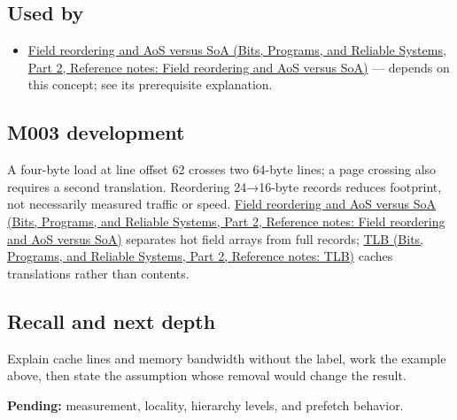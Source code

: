 \subsection{Used by}\label{appendix-e4ccdbab8320-used-by}

\hypertarget{appendix-e4ccdbab8320-used-by}{}

\begin{itemize}
\tightlist
\item
  \href{../01-Bits-Programs-and-Reliable-Systems-P02/main.pdf\#appendix-5522ad176ca0}{Field reordering and AoS versus SoA (Bits, Programs, and Reliable Systems, Part 2, Reference notes: Field reordering and AoS versus SoA)} --- depends on this concept; see its prerequisite explanation.
\end{itemize}

\subsection{M003 development}\label{appendix-e4ccdbab8320-m003-development}

\hypertarget{appendix-e4ccdbab8320-m003-development}{}

A four-byte load at line offset 62 crosses two 64-byte lines; a page crossing also requires a second translation. Reordering 24→16-byte records reduces footprint, not necessarily measured traffic or speed. \href{../01-Bits-Programs-and-Reliable-Systems-P02/main.pdf\#appendix-5522ad176ca0}{Field reordering and AoS versus SoA (Bits, Programs, and Reliable Systems, Part 2, Reference notes: Field reordering and AoS versus SoA)} separates hot field arrays from full records; \href{../01-Bits-Programs-and-Reliable-Systems-P02/main.pdf\#appendix-7a2d9c5ce511}{TLB (Bits, Programs, and Reliable Systems, Part 2, Reference notes: TLB)} caches translations rather than contents.

\subsection{Recall and next depth}\label{appendix-e4ccdbab8320-recall-and-next-depth}

\hypertarget{appendix-e4ccdbab8320-recall-and-next-depth}{}

Explain cache lines and memory bandwidth without the label, work the example above, then state the assumption whose removal would change the result.

\textbf{Pending:} measurement, locality, hierarchy levels, and prefetch behavior.

